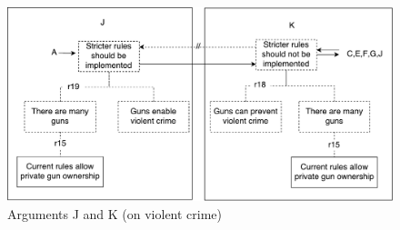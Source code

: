 \documentclass[]{article}
\begin{document}
\begin{figure}
\includegraphics[scale=0.5]{images/JK.pdf}
\caption{Arguments J and K (on violent crime)}
\end{figure}



\end{document}
